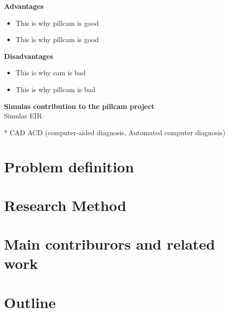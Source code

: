     \textbf{Advantages}
      \begin{itemize}
        \item This is why pillcam is good %
        \item This is why pillcam is good %
      \end{itemize}

    \vspace{5px}
    \textbf{Disadvantages}
      \begin{itemize}
        \item This is why cam is bad %
        \item This is why pillcam is bad %
      \end{itemize}
 
    
    
    \vspace{10px}

\textbf{Simulas contribution to the pillcam project}\\
    Simulas EIR
        

        
    * CAD ACD (computer-aided diagnosis, Automated computer diagnosis)

    \vspace{10px}
    
    
\section{Problem definition}
\section{Research Method}
\section{Main contriburors and related work}
\section{Outline}
